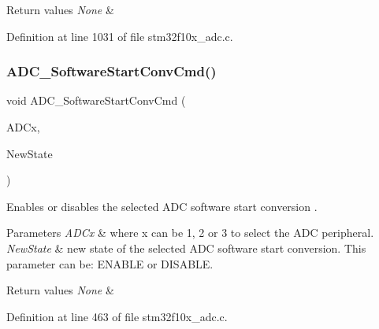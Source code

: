 \begin{DoxyRetVals}{Return values}
{\em None} & \\
\hline
\end{DoxyRetVals}


Definition at line 1031 of file stm32f10x\+\_\+adc.\+c.

\mbox{\label{group___a_d_c___private___functions_ga694130a8d1ad3c8877b7eddb29611b30}} 
\subsubsection{\texorpdfstring{A\+D\+C\+\_\+\+Software\+Start\+Conv\+Cmd()}{ADC\_SoftwareStartConvCmd()}}
{\footnotesize\ttfamily void A\+D\+C\+\_\+\+Software\+Start\+Conv\+Cmd (\begin{DoxyParamCaption}\item[{\hyperlink{struct_a_d_c___type_def}{A\+D\+C\+\_\+\+Type\+Def} $\ast$}]{A\+D\+Cx,  }\item[{\hyperlink{group___exported__types_gac9a7e9a35d2513ec15c3b537aaa4fba1}{Functional\+State}}]{New\+State }\end{DoxyParamCaption})}



Enables or disables the selected A\+DC software start conversion . 


\begin{DoxyParams}{Parameters}
{\em A\+D\+Cx} & where x can be 1, 2 or 3 to select the A\+DC peripheral. \\
\hline
{\em New\+State} & new state of the selected A\+DC software start conversion. This parameter can be\+: E\+N\+A\+B\+LE or D\+I\+S\+A\+B\+LE. \\
\hline
\end{DoxyParams}

\begin{DoxyRetVals}{Return values}
{\em None} & \\
\hline
\end{DoxyRetVals}


Definition at line 463 of file stm32f10x\+\_\+adc.\+c.

